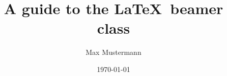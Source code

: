\documentclass{beamer}
\begin{document}
\author{Max Mustermann}
\title{A guide to the \LaTeX\ beamer class}
\date{\today}

\begin{frame}
    \titlepage
\end{frame}
\end{document}
